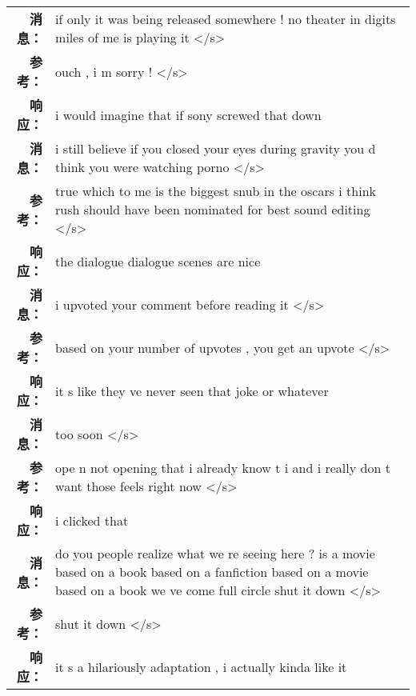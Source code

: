 \begin{tabularx}{0.8\textwidth}{@{}rX@{}}%
\toprule%
\midrule%
\textbf{消息：}&if only it was being released somewhere ! no theater in digits miles of me is playing it </s>\\%
\textbf{参考：}&ouch , i m sorry ! </s>\\%
\textbf{响应：}&i would imagine that if sony screwed that down\\%
\midrule%
\textbf{消息：}&i still believe if you closed your eyes during gravity you d think you were watching porno </s>\\%
\textbf{参考：}&true which to me is the biggest snub in the oscars i think rush should have been nominated for best sound editing </s>\\%
\textbf{响应：}&the dialogue dialogue scenes are nice\\%
\midrule%
\textbf{消息：}&i upvoted your comment before reading it </s>\\%
\textbf{参考：}&based on your number of upvotes , you get an upvote </s>\\%
\textbf{响应：}&it s like they ve never seen that joke or whatever\\%
\midrule%
\textbf{消息：}&too soon </s>\\%
\textbf{参考：}&ope n not opening that i already know t i and i really don t want those feels right now </s>\\%
\textbf{响应：}&i clicked that\\%
\midrule%
\textbf{消息：}&do you people realize what we re seeing here ? is a movie based on a book based on a fanfiction based on a movie based on a book we ve come full circle shut it down </s>\\%
\textbf{参考：}&shut it down </s>\\%
\textbf{响应：}&it s a hilariously adaptation , i actually kinda like it\\%
\midrule\bottomrule%
%
\end{tabularx}
